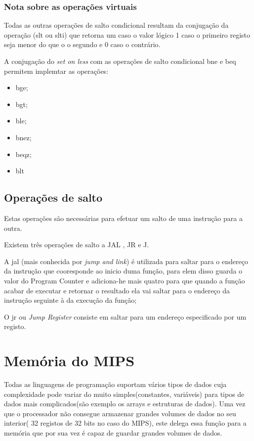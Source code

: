 \documentclass[10pt,a4paper]{book}
\begin{document}
     \subsection{Nota sobre as operações virtuais}

	Todas as outras operações de salto condicional resultam da conjugação da operação (slt ou slti) que retorna um caso o valor lógico 1 caso o primeiro registo seja menor do que o o segundo e 0 caso o contrário.

	A conjugação do \textit{set on less} com as operações de salto condicional bne e beq permitem implemtar as operações:
	    \begin{itemize}
	     \item bge;
	     \item bgt;
	     \item ble;
	     \item bnez;
	     \item beqz;
	     \item blt
	   \end{itemize}




 	\section{Operações de salto}

 		Estas operações são necessárias para efetuar um salto de uma instrução para a outra.

 		Existem três operações de salto a JAL , JR e J.

 		A jal (mais conhecida por \textit{jump and link}) é utilizada para saltar para o endereço da instrução que cooresponde ao inicio duma função, para elem disso guarda o valor do Program Counter e adiciona-he mais quatro para que quando a função acabar de executar e retornar o resultado ela vai saltar para o endereço da instrução seguinte à da execução da função;

 		O jr ou  \textit{Jump Register}  consiste em saltar para um endereço especificado por um registo.




 \chapter{Memória do MIPS}

    Todas as linguagens de programação suportam vários tipos de dados cuja complexidade pode variar do muito simples(constantes, variáveis) para tipos de dados mais complicados(são exemplo os arrays e estruturas de dados).
    Uma vez que o processador não consegue armazenar grandes volumes de dados no seu interior( 32 registos de 32 bits no caso do MIPS), este delega essa função para a memória que por sua vez é capaz de guardar grandes volumes de dados.
\end{document}
